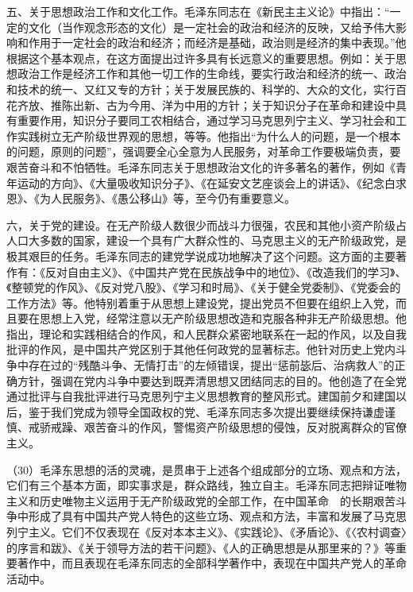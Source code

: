 五、关于思想政治工作和文化工作。毛泽东同志在《新民主主义论》中指出：“一定的文化（当作观念形态的文化）是一定社会的政治和经济的反映，又给予伟大影响和作用于一定社会的政治和经济；而经济是基础，政治则是经济的集中表现。”他根据这个基本观点，在这方面提出过许多具有长远意义的重要思想。例如：关于思想政治工作是经济工作和其他一切工作的生命线，要实行政治和经济的统一、政治和技术的统一、又红又专的方针；关于发展民族的、科学的、大众的文化，实行百花齐放、推陈出新、古为今用、洋为中用的方针；关于知识分子在革命和建设中具有重要作用，知识分子要同工农相结合，通过学习马克思列宁主义、学习社会和工作实践树立无产阶级世界观的思想，等等。他指出“为什么人的问题，是一个根本的问题，原则的问题”，强调要全心全意为人民服务，对革命工作要极端负责，要艰苦奋斗和不怕牺牲。毛泽东同志关于思想政治文化的许多著名的著作，例如《青年运动的方向》、《大量吸收知识分子》、《在延安文艺座谈会上的讲话》、《纪念白求恩》、《为人民服务》、《愚公移山》等，至今仍有重要意义。

六，关于党的建设。在无产阶级人数很少而战斗力很强，农民和其他小资产阶级占人口大多数的国家，建设一个具有广大群众性的、马克思主义的无产阶级政党，是极其艰巨的任务。毛泽东同志的建党学说成功地解决了这个问题。这方面的主要著作有：《反对自由主义》、《中国共产党在民族战争中的地位》、《改造我们的学习》、《整顿党的作风》、《反对党八股》、《学习和时局》、《关于健全党委制》、《党委会的工作方法》等。他特别着重于从思想上建设党，提出党员不但要在组织上入党，而且要在思想上入党，经常注意以无产阶级思想改造和克服各种非无产阶级思想。他指出，理论和实践相结合的作风，和人民群众紧密地联系在一起的作风，以及自我批评的作风，是中国共产党区别于其他任何政党的显著标志。他针对历史上党内斗争中存在过的“残酷斗争、无情打击”的左倾错误，提出“惩前毖后、治病救人”的正确方针，强调在党内斗争中要达到既弄清思想又团结同志的目的。他创造了在全党通过批评与自我批评进行马克思列宁主义思想教育的整风形式。建国前夕和建国以后，鉴于我们党成为领导全国政权的党、毛泽东同志多次提出要继续保持谦虚谨慎、戒骄戒躁、艰苦奋斗的作风，警惕资产阶级思想的侵蚀，反对脱离群众的官僚主义。

（30）毛泽东思想的活的灵魂，是贯串于上述各个组成部分的立场、观点和方法，它们有三个基本方面，即实事求是，群众路线，独立自主。毛泽东同志把辩证唯物主义和历史唯物主义运用于无产阶级政党的全部工作，在中国革命　的长期艰苦斗争中形成了具有中国共产党人特色的这些立场、观点和方法，丰富和发展了马克思列宁主义。它们不仅表现在《反对本本主义》、《实践论》、《矛盾论》、《〈农村调查〉的序言和跋》、《关于领导方法的若干问题》、《人的正确思想是从那里来的？》等重要著作中，而且表现在毛泽东同志的全部科学著作中，表现在中国共产党人的革命活动中。

